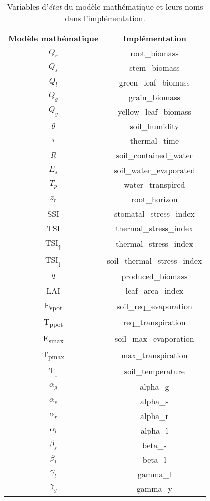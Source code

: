 
\begin{table}[h]
  \centering
  \begin{tabular}{|c|c|}
    \hline
    \textbf{Modèle mathématique} & \textbf{Implémentation} \\
    \hline
    $Q_r$ & root\_biomass \\
    $Q_s$ & stem\_biomass \\
    $Q_l$ & green\_leaf\_biomass \\
    $Q_g$ & grain\_biomass \\
    $Q_y$ & yellow\_leaf\_biomass \\
    $\theta$ & soil\_humidity \\
    $\tau$ & thermal\_time \\
    $R$ & soil\_contained\_water \\
    $E_s$ & soil\_water\_evaporated \\
    $T_p$ & water\_transpired \\
    $z_r$ & root\_horizon \\
    SSI & stomatal\_stress\_index \\
    TSI & thermal\_stress\_index \\
    TSI$_{\uparrow}$ & thermal\_stress\_index \\
    TSI$_{\downarrow}$ & soil\_thermal\_stress\_index \\
    $q$ & produced\_biomass \\
    LAI & leaf\_area\_index \\
    E\textsubscript{spot} & soil\_req\_evaporation \\
    T\textsubscript{ppot} & req\_transpiration \\
    E\textsubscript{smax} & soil\_max\_evaporation \\
    T\textsubscript{pmax} & max\_transpiration \\
    T$_{\downarrow}$ & soil\_temperature \\
    $\alpha_g$ & alpha\_g \\
    $\alpha_s$ & alpha\_s \\
    $\alpha_r$ & alpha\_r \\
    $\alpha_l$ & alpha\_l \\
    $\beta_s$ & beta\_s \\
    $\beta_l$ & beta\_l \\
    $\gamma_l$ & gamma\_l \\
    $\gamma_y$ & gamma\_y \\
    \hline
    \end{tabular}
  \caption{Variables d'\emph{état} du modèle mathématique et leurs noms
  dans l'implémentation.}
  \label{table:state_var}
\end{table}


